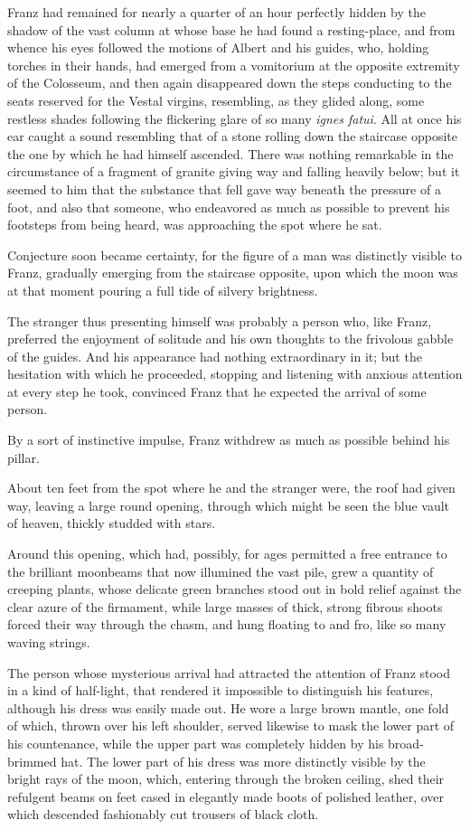 Franz had remained for nearly a quarter of an hour perfectly hidden by
the shadow of the vast column at whose base he had found a
resting-place, and from whence his eyes followed the motions of Albert
and his guides, who, holding torches in their hands, had emerged from a
vomitorium at the opposite extremity of the Colosseum, and then again
disappeared down the steps conducting to the seats reserved for the
Vestal virgins, resembling, as they glided along, some restless shades
following the flickering glare of so many \textit{ignes fatui}. All at once
his ear caught a sound resembling that of a stone rolling down the
staircase opposite the one by which he had himself ascended. There was
nothing remarkable in the circumstance of a fragment of granite giving
way and falling heavily below; but it seemed to him that the substance
that fell gave way beneath the pressure of a foot, and also that
someone, who endeavored as much as possible to prevent his footsteps
from being heard, was approaching the spot where he sat.

Conjecture soon became certainty, for the figure of a man was
distinctly visible to Franz, gradually emerging from the staircase
opposite, upon which the moon was at that moment pouring a full tide of
silvery brightness.

The stranger thus presenting himself was probably a person who, like
Franz, preferred the enjoyment of solitude and his own thoughts to the
frivolous gabble of the guides. And his appearance had nothing
extraordinary in it; but the hesitation with which he proceeded,
stopping and listening with anxious attention at every step he took,
convinced Franz that he expected the arrival of some person.

By a sort of instinctive impulse, Franz withdrew as much as possible
behind his pillar.

About ten feet from the spot where he and the stranger were, the roof
had given way, leaving a large round opening, through which might be
seen the blue vault of heaven, thickly studded with stars.

Around this opening, which had, possibly, for ages permitted a free
entrance to the brilliant moonbeams that now illumined the vast pile,
grew a quantity of creeping plants, whose delicate green branches stood
out in bold relief against the clear azure of the firmament, while
large masses of thick, strong fibrous shoots forced their way through
the chasm, and hung floating to and fro, like so many waving strings.

The person whose mysterious arrival had attracted the attention of
Franz stood in a kind of half-light, that rendered it impossible to
distinguish his features, although his dress was easily made out. He
wore a large brown mantle, one fold of which, thrown over his left
shoulder, served likewise to mask the lower part of his countenance,
while the upper part was completely hidden by his broad-brimmed hat.
The lower part of his dress was more distinctly visible by the bright
rays of the moon, which, entering through the broken ceiling, shed
their refulgent beams on feet cased in elegantly made boots of polished
leather, over which descended fashionably cut trousers of black cloth.

